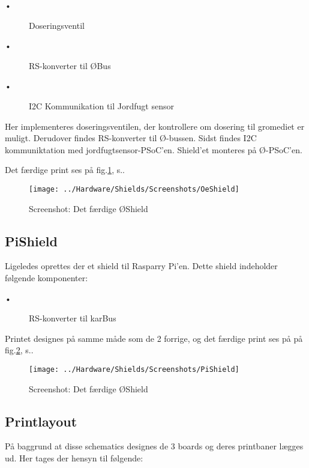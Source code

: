 \begin{description}
 \item[•] Doseringsventil
 \item[•] RS-konverter til ØBus
 \item[•] I2C Kommunikation til Jordfugt sensor
\end{description}

Her implementeres doseringsventilen, der kontrollere om dosering til gromediet er muligt. Derudover findes RS-konverter til Ø-bussen. Sidst findes I2C kommuniktation med jordfugtsensor-PSoC'en. 
Shield'et monteres på Ø-PSoC'en.

Det færdige print ses på fig.\ref{screenshot:OeShield}, s.\pageref{screenshot:OeShield}.

\newpage
\begin{figure}[H]
	\centering
	\texttt{[image: ../Hardware/Shields/Screenshots/OeShield]}
	\caption{Screenshot: Det færdige ØShield}
	\label{screenshot:OeShield}
\end{figure}



\newpage
\subsection{PiShield}

Ligeledes oprettes der et shield til Rasparry Pi'en. Dette shield indeholder følgende komponenter: 

\begin{description}
 \item[•] RS-konverter til karBus
\end{description}

Printet designes på samme måde som de 2 forrige, og det færdige print ses på på fig.\ref{screenshot:PiShield}, s.\pageref{screenshot:PiShield}.

\newpage
\begin{figure}[H]
	\centering
	\texttt{[image: ../Hardware/Shields/Screenshots/PiShield]}
	\caption{Screenshot: Det færdige ØShield}
	\label{screenshot:PiShield}
\end{figure}


\newpage
\subsection{Printlayout}
På baggrund at disse schematics designes de 3 boards og deres printbaner lægges ud. Her tages der hensyn til følgende: 

